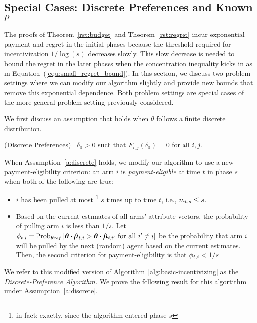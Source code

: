 \subsection{Special Cases: Discrete Preferences and Known $p$}

The proofs of Theorem~\ref{rst:budget} and Theorem~\ref{rst:regret} incur exponential payment and regret in the initial phases because the threshold required for incentivization $1/\log(s)$ decreases slowly.  This slow decrease is needed to bound the regret in the later phases when the concentration inequality kicks in as in Equation~(\ref{equ:small_regret_bound}). In this section, we discuss two problem settings where we can modify our algorithm slightly and provide new bounds that remove this exponential dependence.  Both problem settings are special cases of the more general problem setting previously considered.

We first discuss an assumption that holds when $\theta$ follows a finite discrete distribution.
\begin{assumption}
\label{a:discrete}
(Discrete Preferences) 
$\exists \delta_0>0$ such that $F_{i,j}(\delta_0)=0$ for all $i,j$.
\end{assumption}

When Assumption~\ref{a:discrete} holds, we modify our algorithm to use a new payment-eligibility criterion: an arm $i$ is \emph{payment-eligible} at time $t$ in phase $s$ when both of the following are true:
\begin{itemize}
\item $i$ has been pulled at most%
\footnote{in fact: exactly, since the algorithm entered phase $s$}
$s$ times up to time $t$, i.e., $m_{t,s} \leq s$.
\item Based on the current estimates  of all arms'
attribute vectors, the probability of pulling arm $i$ is less than $1/s$. Let $\PullProb{t}{i} = \Prob[\AgV \sim \AgentDist]{\AgV \cdot \ArmEV{t}{i} > \AgV
  \cdot \ArmEV{t}{i'} \mbox{ for all } i' \neq i}$
be the probability that arm $i$ will be pulled
by the next (random) agent based on the current estimates. 
Then, the second criterion for payment-eligibility is that
$\phi_{t,i} < 1/s$.
\end{itemize}

We refer to this modified version of Algorithm~\ref{alg:basic-incentivizing} as the {\it Discrete-Preference Algorithm.} We prove the following result for this algortithm under Assumption~\ref{a:discrete}.

